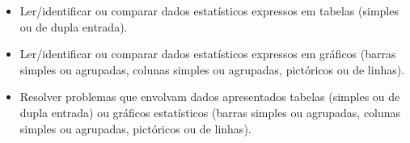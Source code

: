 \begin{escolha}


\begin{itemize}
    \item Ler/identificar ou comparar dados estatísticos expressos em tabelas
(simples ou de dupla entrada).

    \item Ler/identificar ou comparar dados estatísticos expressos em gráficos
(barras simples ou agrupadas, colunas simples ou agrupadas, pictóricos
ou de linhas).

    \item Resolver problemas que envolvam dados apresentados tabelas (simples ou
de dupla entrada) ou gráficos estatísticos (barras simples ou agrupadas,
colunas simples ou agrupadas, pictóricos ou de linhas).
\end{itemize}

\end{escolha}
